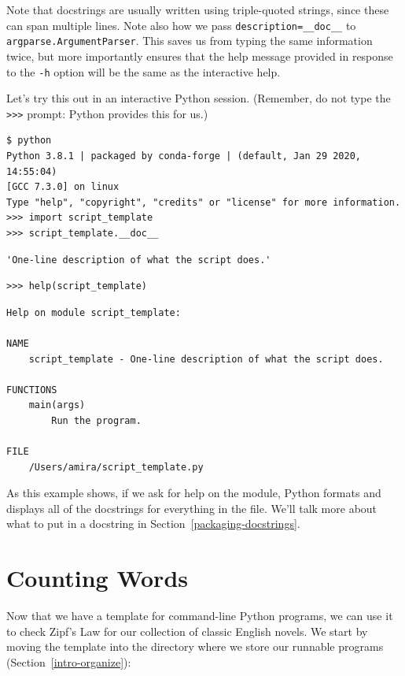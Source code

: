 \documentclass[
]{krantz}
\begin{document}
Note that docstrings are usually written using triple-quoted strings,
since these can span multiple lines.
Note also how we pass \texttt{description=\_\_doc\_\_} to \texttt{argparse.ArgumentParser}.
This saves us from typing the same information twice,
but more importantly ensures that
the help message provided in response to the \texttt{-h} option
will be the same as the interactive help.

Let's try this out in an interactive Python session.
(Remember, do not type the \texttt{\textgreater{}\textgreater{}\textgreater{}} prompt:
Python provides this for us.)

\begin{verbatim}
$ python
Python 3.8.1 | packaged by conda-forge | (default, Jan 29 2020, 14:55:04)
[GCC 7.3.0] on linux
Type "help", "copyright", "credits" or "license" for more information.
>>> import script_template
>>> script_template.__doc__
\end{verbatim}

\begin{verbatim}
'One-line description of what the script does.'
\end{verbatim}

\begin{verbatim}
>>> help(script_template)
\end{verbatim}

\begin{verbatim}
Help on module script_template:

NAME
    script_template - One-line description of what the script does.

FUNCTIONS
    main(args)
        Run the program.

FILE
    /Users/amira/script_template.py
\end{verbatim}

As this example shows,
if we ask for help on the module,
Python formats and displays all of the docstrings for everything in the file.
We'll talk more about what to put in a docstring in Section~\ref{packaging-docstrings}.

\hypertarget{scripting-wordcount}{%
\section{Counting Words}\label{scripting-wordcount}}

Now that we have a template for command-line Python programs,
we can use it to check Zipf's Law for our collection of classic English novels.
We start by moving the template into the directory
where we store our runnable programs (Section~\ref{intro-organize}):
\end{document}
